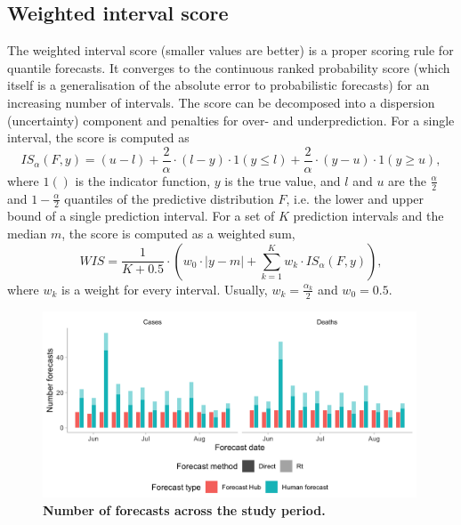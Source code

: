 \documentclass[10pt,a4paper,twocolumn]{article}
\begin{document}
\subsection*{Weighted interval score}
\label{sec:wis}

The weighted interval score (smaller values are better) is a proper scoring rule for quantile forecasts. It converges to the continuous ranked probability score (which itself is a generalisation of the absolute error to probabilistic forecasts) for an increasing number of intervals. The score can be decomposed into a dispersion (uncertainty) component and penalties for over- and underprediction. For a single interval, the score is computed as 
  $$IS_\alpha(F,y) = (u-l) + \frac{2}{\alpha} \cdot (l-y) \cdot 1(y \leq l) + \frac{2}{\alpha} \cdot (y-u) \cdot 1(y \geq u), $$ 
  where $1()$ is the indicator function, $y$ is the true value, and $l$ and $u$ are the $\frac{\alpha}{2}$ and $1 - \frac{\alpha}{2}$ quantiles of the predictive distribution $F$, i.e. the lower and upper bound of a single prediction interval. For a set of $K$ prediction intervals and the median $m$, the score is computed as a weighted sum, 
  $$WIS = \frac{1}{K + 0.5} \cdot \left( w_0 \cdot |y - m| + \sum_{k = 1}^{K} w_k \cdot IS_{\alpha}(F, y) \right), $$
  where $w_k$ is a weight for every interval. Usually, $w_k = \frac{\alpha_k}{2}$ and $w_0 = 0.5$. 
  



\begin{figure}
\centering
\includegraphics[width=0.99\textwidth]{../output/figures/num-forecasters.png}
\caption{\bf{Number of forecasts across the study period.}}
\label{fig:num-forecasters}
\end{figure}
\end{document}
